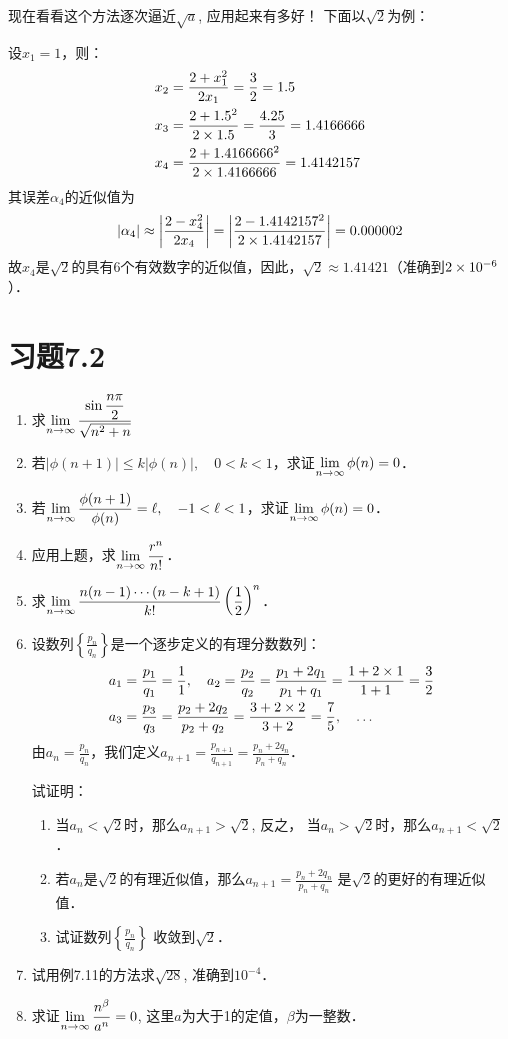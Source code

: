 现在看看这个方法逐次逼近$\sqrt{a}$, 应用起来有多好！
下面以$\sqrt{2}$为例：

设$x_1=1$，则：
\[\begin{split}
    x_2&=\dfrac{2+x^2_1}{2x_1}=\dfrac{3}{2}=1.5\\
    x_3&=\dfrac{2+1.5^2}{2\times 1.5}=\dfrac{4.25}{3}=1.4166666   \\
    x_4&=\dfrac{2+1.4166666^2}{2\times 1.4166666}=1.4142157   \\
\end{split}\]
其误差$\alpha_4$的近似值为
\[|\alpha_4|\approx \left|\dfrac{2-x^2_4}{2x_4}\right|=\left|\dfrac{2-1.4142157^2}{2\times 1.4142157}\right|=0.000002\]
故$x_4$是$\sqrt{2}$的具有6个有效数字的近似值，因此，$\sqrt{2}\approx 1.41421$（准确到$2\times10^{-6}$）．

\section*{习题7.2}

\begin{enumerate}
    \item 求$\displaystyle\lim_{n\to\infty}\dfrac{\sin\dfrac{n\pi}{2}}{\sqrt{n^2+n}} $
\item 若$|\phi(n+1)|\le k|\phi(n)|,\quad 0<k<1$，求证$\displaystyle\lim_{n\to\infty}\phi(n)=0$．
\item 若$\displaystyle\lim_{n\to\infty}\dfrac{\phi(n+1)}{\phi(n)}=\ell,\quad -1<\ell<1$，求证$\displaystyle\lim_{n\to\infty}\phi(n)=0$．
\item 应用上题，求$\displaystyle\lim_{n\to\infty}\dfrac{r^n}{n!}$．
\item 求$\displaystyle\lim_{n\to\infty}\dfrac{n(n-1)\cdots (n-k+1)}{k!}\left(\dfrac{1}{2}\right)^n$．
\item 设数列$\left\{\frac{p_n}{q_n}\right\}$是一个逐步定义的有理分数数列：
\[\begin{split}
    a_1&=\dfrac{p_1}{q_1}=\dfrac{1}{1},\quad a_2=\dfrac{p_2}{q_2}=\dfrac{p_1+2q_1}{p_1+q_1}=\dfrac{1+2\times 1}{1+1}=\dfrac{3}{2}\\
a_3&=\dfrac{p_3}{q_3}=\dfrac{p_2+2q_2}{p_2+q_2}=\dfrac{3+2\times2}{3+2}=\dfrac{7}{5},\quad \ldots
\end{split}\]
由$a_n=\frac{p_n}{q_n}$，我们定义$a_{n+1}=\frac{p_{n+1}}{q_{n+1}}=\frac{p_n+2q_n}{p_n+q_n}$．

试证明： \begin{enumerate}
    \item 当$a_n<\sqrt{2}$时，那么$a_{n+1}>\sqrt{2}$, 反之，
    当$a_n>\sqrt{2}$时，那么$a_{n+1}<\sqrt{2}$．
    \item 若$a_n$是$\sqrt{2}$的有理近似值，那么$a_{n+1}=\frac{p_n+2q_n}{p_n+q_n}$
    是$\sqrt{2}$的更好的有理近似值．
    \item 试证数列$\left\{\frac{p_n}{q_n}\right\}$
   收敛到$\sqrt{2}$．
\end{enumerate}
\item 试用例7.11的方法求$\sqrt{28}$, 准确到$10^{-4}$．
\item 求证$\displaystyle\lim_{n\to\infty}\dfrac{n^{\beta}}{a^n}=0$, 这里$a$为大于1的定值，$\beta$为一整数．
\end{enumerate}

